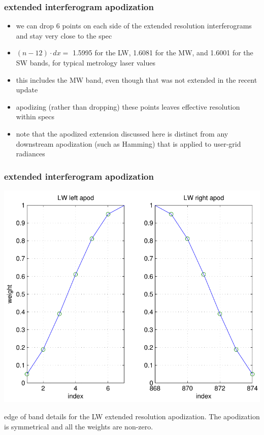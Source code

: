 \documentclass[11pt]{beamer}
\begin{document}
\begin{frame}
\frametitle{extended interferogram apodization}

\begin{itemize}
  \item we can drop 6 points on each side of the extended resolution
    interferograms and stay very close to the {\opd} spec

 \item $(n - 12) \cdot dx =$ 1.5995 for the LW, 1.6081 for the MW,
   and 1.6001 for the SW bands, for typical metrology laser values

 \item this includes the MW band, even though that was not extended
   in the recent update

 \item apodizing (rather than dropping) these points leaves
   effective resolution within specs

 \item note that the apodized extension discussed here is distinct
   from any downstream apodization (such as Hamming) that is applied
   to user-grid radiances

\end{itemize}

\end{frame}
\begin{frame}
\frametitle{extended interferogram apodization}
\begin{center}
  \includegraphics[scale=0.5]{figures/apod_LW.pdf}
\end{center}
edge of band details for the LW extended resolution apodization.
The apodization is symmetrical and all the weights are non-zero.
\end{frame}
\end{document}
